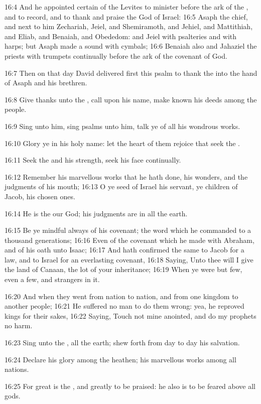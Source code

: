 16:4 And he appointed certain of the Levites to minister before the ark of the \LORD, and to record, and to thank and praise the \LORD God of Israel: 16:5 Asaph the chief, and next to him Zechariah, Jeiel, and Shemiramoth, and Jehiel, and Mattithiah, and Eliab, and Benaiah, and Obededom: and Jeiel with psalteries and with harps; but Asaph made a sound with cymbals; 16:6 Benaiah also and Jahaziel the priests with trumpets continually before the ark of the covenant of God.

16:7 Then on that day David delivered first this psalm to thank the \LORD into the hand of Asaph and his brethren.

16:8 Give thanks unto the \LORD, call upon his name, make known his deeds among the people.

16:9 Sing unto him, sing psalms unto him, talk ye of all his wondrous works.

16:10 Glory ye in his holy name: let the heart of them rejoice that seek the \LORD.

16:11 Seek the \LORD and his strength, seek his face continually.

16:12 Remember his marvellous works that he hath done, his wonders, and the judgments of his mouth; 16:13 O ye seed of Israel his servant, ye children of Jacob, his chosen ones.

16:14 He is the \LORD our God; his judgments are in all the earth.

16:15 Be ye mindful always of his covenant; the word which he commanded to a thousand generations; 16:16 Even of the covenant which he made with Abraham, and of his oath unto Isaac; 16:17 And hath confirmed the same to Jacob for a law, and to Israel for an everlasting covenant, 16:18 Saying, Unto thee will I give the land of Canaan, the lot of your inheritance; 16:19 When ye were but few, even a few, and strangers in it.

16:20 And when they went from nation to nation, and from one kingdom to another people; 16:21 He suffered no man to do them wrong: yea, he reproved kings for their sakes, 16:22 Saying, Touch not mine anointed, and do my prophets no harm.

16:23 Sing unto the \LORD, all the earth; shew forth from day to day his salvation.

16:24 Declare his glory among the heathen; his marvellous works among all nations.

16:25 For great is the \LORD, and greatly to be praised: he also is to be feared above all gods.

